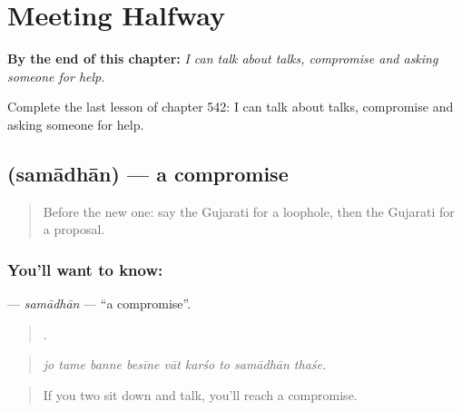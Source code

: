 
\chapter{Meeting Halfway}
\label{ch:gu-meeting-halfway}

\begin{chapteropening}
\textbf{By the end of this chapter:} \emph{I can talk about talks, compromise and asking someone for help.}

Complete the last lesson of chapter 542: I can talk about talks, compromise and asking someone for help.
\end{chapteropening}

\section[\texorpdfstring{\gu{સમાધાન} (samādhān)}{સમાધાન (samādhān)}]{ (samādhān) — a compromise}

\label{lesson:GU-C542-samadhan}



\begin{quote}
Before the new one: say the Gujarati for a loophole, then the Gujarati for a proposal.
\end{quote}

\subsection*{You'll want to know: }
\textbf{} — \emph{samādhān} — \textquotedblleft{}a compromise\textquotedblright{}.

\begin{quote}
        .
\end{quote}

\begin{quote}
\emph{jo tame banne besīne vāt karśo to samādhān thaśe.}
\end{quote}

\begin{quote}
If you two sit down and talk, you'll reach a compromise.
\end{quote}

